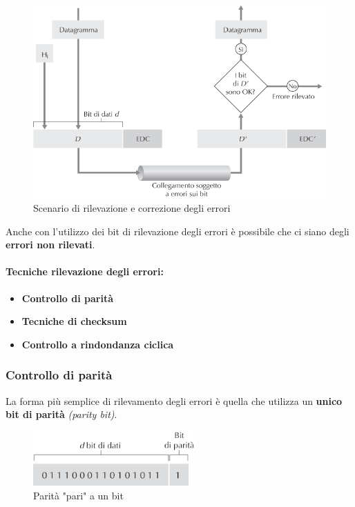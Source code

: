 \documentclass[12pt]{article}
\begin{document}
    \begin{figure}[!htb]
        \centering
        \includegraphics[width=1\textwidth]{errorebit.png}
        \caption{Scenario di rilevazione e correzione degli errori}
    \end{figure}
    \FloatBarrier
    Anche con l'utilizzo dei bit di rilevazione degli errori è possibile che ci siano degli \textbf{errori non rilevati}.
    \paragraph{Tecniche rilevazione degli errori:}
    \begin{itemize}
        \item \textbf{Controllo di parità}
        \item \textbf{Tecniche di checksum}
        \item \textbf{Controllo a rindondanza ciclica}
    \end{itemize}

    \subsubsection{Controllo di parità}
    La forma più semplice di rilevamento degli errori è quella che utilizza un \textbf{unico bit di parità} \textit{(parity bit)}.

    \begin{figure}[!htb]
        \centering
        \includegraphics[width=0.55\textwidth]{paritybit.png}
        \caption{Parità "pari" a un bit}
    \end{figure}
    \FloatBarrier
\end{document}
